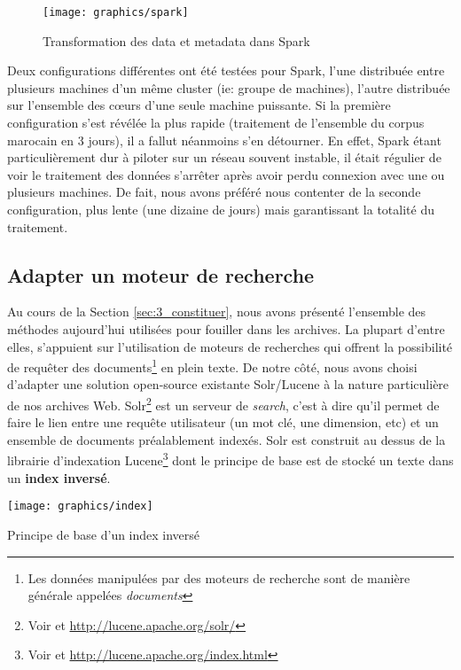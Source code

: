 \documentclass[symmetric,justified,marginals=raggedouter]{tufte-book}
\begin{document}
\begin{figure*}%
  \texttt{[image: graphics/spark]}
  \caption{Transformation des data et metadata dans Spark}
  \label{fig:spark}
\end{figure*}

\noindent Deux configurations différentes ont été testées pour Spark, l'une distribuée entre plusieurs machines d'un même cluster (ie: groupe de machines), l'autre distribuée sur l'ensemble des cœurs d'une seule machine puissante. Si la première configuration s'est révélée la plus rapide (traitement de l'ensemble du corpus marocain en 3 jours), il a fallut néanmoins s'en détourner. En effet, Spark étant particulièrement dur à piloter sur un réseau souvent instable, il était régulier de voir le traitement des données s'arrêter après avoir perdu connexion avec une ou plusieurs machines. De fait, nous avons préféré nous contenter de la seconde configuration, plus lente (une dizaine de jours) mais garantissant la totalité du traitement. 

\subsection{Adapter un moteur de recherche}

\noindent Au cours de la Section \ref{sec:3_constituer}, nous avons présenté l'ensemble des méthodes aujourd'hui utilisées pour fouiller dans les archives. La plupart d'entre elles, s'appuient sur l'utilisation de moteurs de recherches qui offrent la possibilité de requêter des documents\footnote{Les données manipulées par des moteurs de recherche sont de manière générale appelées \textit{documents}} en plein texte. De notre côté, nous avons choisi d'adapter une solution open-source existante Solr/Lucene à la nature particulière de nos archives Web. Solr\footnote{Voir \citep{grainger_solr_2014} et \url{http://lucene.apache.org/solr/}} est un serveur de \textit{search}, c'est à dire qu'il permet de faire le lien entre une requête utilisateur (un mot clé, une dimension, etc) et un ensemble de documents préalablement indexés. Solr est construit au dessus de la librairie d'indexation Lucene\footnote{Voir \citep{hatcher_lucene_2004} et \url{http://lucene.apache.org/index.html}} dont le principe de base est de stocké un texte dans un \textbf{index inversé}.

\begin{marginfigure}%
  \texttt{[image: graphics/index]}
  \vspace*{0.2cm}  
  \caption{Principe de base d'un index inversé}
  \label{fig:index}
\end{marginfigure} 
\end{document}

